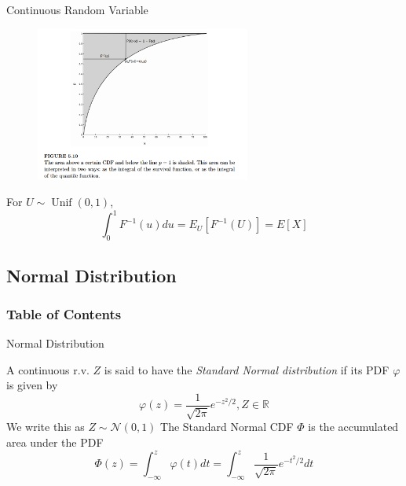 \documentclass[8pt]{beamer}
\newcommand{\myunif}[2]{\operatorname{Unif}\!\left(#1, #2\right)}
\begin{document}
\begin{frame}{Continuous Random Variable}
    \begin{figure}
        \centering
        \includegraphics[width=0.63\textwidth]{fig4.png}
    \end{figure}

    For $U \sim \myunif{0}{1}$, \[\int_0^1 F^{-1}(u) du = E_{U}[F^{-1}(U)]= E[X]\]

\end{frame}

\subsection{Normal Distribution}

\begin{frame}
    \frametitle{Table of Contents}
    \tableofcontents[currentsection]
\end{frame}

\begin{frame}{Normal Distribution}
    \begin{definition}
        A continuous r.v. $Z$ is said to have the \textit{Standard Normal distribution} if its PDF $\varphi$ is given by
        \[\varphi (z) = \frac{1}{\sqrt{2\pi}} e^{-z^2/2}, Z \in \mathbb{R}\]
        We write this as $Z \sim \mathcal{N}(0,1)$
        The Standard Normal CDF $\Phi$ is the accumulated area under the PDF
        \[ \Phi(z) = \int^z_{-\infty} \varphi(t) dt = \int^z_{-\infty}\frac{1}{\sqrt{2\pi}}e^{-t^2/2}dt\]
    \end{definition}
\end{frame}
\end{document}
